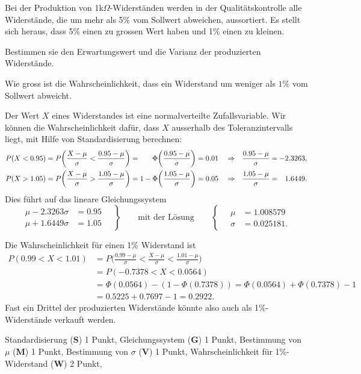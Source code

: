 Bei der Produktion von 1k$\Omega$-Widerständen werden in der
Qualitätskontrolle alle Widerstände, die um mehr als 5\% vom Sollwert
abweichen, aussortiert.
Es stellt sich heraus, dass 5\% einen zu grossen Wert haben und
1\% einen zu kleinen.
\begin{teilaufgaben}
\item
Bestimmen sie den Erwartungswert und die Varianz der produzierten
Widerstände.
\item
Wie gross ist die Wahrscheinlichkeit, dass ein Widerstand um weniger
als $1\%$ vom Sollwert abweicht.
\end{teilaufgaben}


\begin{loesung}
\begin{teilaufgaben}
\item
Der Wert $X$ eines Widerstandes ist eine normalverteilte Zufallsvariable.
Wir können die Wahrscheinlichkeit dafür, dass $X$ ausserhalb des
Toleranzintervalls liegt, mit Hilfe von Standardisierung berechnen:
\begin{align*}
P(X<0.95)
&=
P\biggl(\frac{X-\mu}{\sigma} < \frac{0.95-\mu}{\sigma}\biggr)
=
\phantom{1-\mathstrut}
\Phi\biggl(\frac{0.95-\mu}{\sigma}\biggr)
=
0.01
&&\Rightarrow&
\frac{0.95-\mu}{\sigma}
&=
-2.3263,
\\
P(X>1.05)
&=
P\biggl(\frac{X-\mu}{\sigma} > \frac{1.05-\mu}{\sigma}\biggr)
=
1-\Phi\biggl(\frac{1.05-\mu}{\sigma}\biggr)
=0.05
&&\Rightarrow&
\frac{1.05-\mu}{\sigma}
&=
\phantom{-}1.6449.
\end{align*}
Dies führt auf das lineare Gleichungssystem 
\[
\left.
\begin{aligned}
\mu-2.3263\sigma&=0.95\\
\mu+1.6449\sigma&=1.05
\end{aligned}
\quad
\right\}
\qquad\text{mit der Lösung}\qquad
\left\{
\quad
\begin{aligned}
\mu&=1.008579\\
\sigma&=0.025181.
\end{aligned}
\right.
\]
\item
Die Wahrscheinlichkeit für einen 1\% Widerstand ist
\begin{align*}
P(0.99<X<1.01)
&=
P\biggl(
\frac{0.99-\mu}{\sigma} < \frac{X-\mu}{\sigma} < \frac{1.01-\mu}{\sigma}
\biggr)
\\
&=
P(-0.7378 < X < 0.0564)
\\
&=
\Phi(0.0564) - (1-\Phi(0.7378))
=
\Phi(0.0564) + \Phi(0.7378) - 1
\\
&=
0.5225 + 0.7697 - 1
=
0.2922.
\end{align*}
Fast ein Drittel der produzierten Widerstände könnte also auch als
1\%-Widerstände verkauft werden.
\qedhere
\end{teilaufgaben}
\end{loesung}

\begin{bewertung}
Standardisierung ({\bf S}) 1 Punkt,
Gleichungssystem ({\bf G}) 1 Punkt,
Bestimmung von $\mu$ ({\bf M}) 1 Punkt,
Bestimmung von $\sigma$ ({\bf V}) 1 Punkt,
Wahrscheinlichkeit für 1\%-Widerstand ({\bf W}) 2 Punkt,
\end{bewertung}




